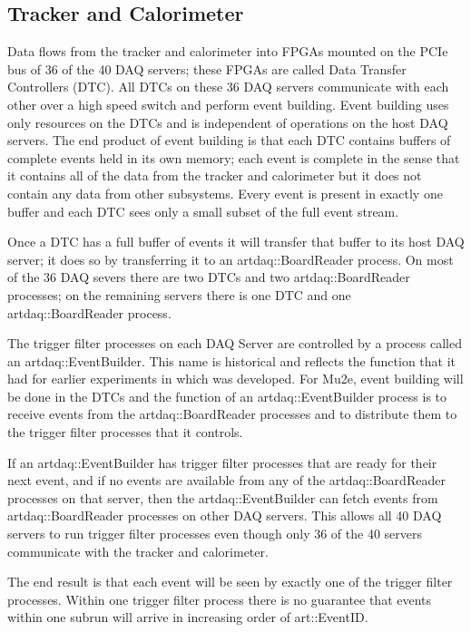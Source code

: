 \subsection{Tracker and Calorimeter}
\label{ssec:TrkAndCal}

Data flows from the tracker and calorimeter into FPGAs mounted on the PCIe bus of 36 of the 40 DAQ servers;
these FPGAs are called Data Transfer Controllers (DTC).
All DTCs on these 36 DAQ servers communicate with each other over a high speed switch
and perform event building.
Event building uses only resources on the DTCs and is independent of operations on the host DAQ servers.
The end product of event building is that each DTC contains buffers of complete events held in its own memory;
each event is complete in the sense that it contains all of the data from the tracker and calorimeter
but it does not contain any data from other subsystems.
Every event is present in exactly one buffer and each DTC sees only a small subset of the full event stream.

Once a DTC has a full buffer of events it will transfer that buffer to its host DAQ server;
it does so by transferring it to an {\code artdaq::BoardReader} process.  On most of the
36 DAQ severs there are two DTCs and two {\code artdaq::BoardReader} processes;
on the remaining servers there is one DTC and one {\code artdaq::BoardReader} process.

The trigger filter processes on each DAQ Server are controlled by a process
called an {\code artdaq::EventBuilder}.
This name is historical and reflects the function that it had for earlier experiments in which \artdaq was developed.
For Mu2e, event building will be done in the DTCs and the function of an
{\code artdaq::EventBuilder} process is to receive events from
the {\code artdaq::BoardReader} processes and to distribute them to the trigger filter \art processes
that it controls.

If an {\code artdaq::EventBuilder} has trigger filter processes that are ready for their next event,
and if no events are available from any of the {\code artdaq::BoardReader} processes on that server,
then the {\code artdaq::EventBuilder} can fetch events from {\code artdaq::BoardReader} processes
on other DAQ servers.
This allows all 40 DAQ servers to run trigger filter processes even though only 36 of the 40 servers
communicate with the tracker and calorimeter.

The end result is that each event will be seen by exactly one of the trigger filter processes.
Within one trigger filter process there is no guarantee that events within one subrun will arrive in
increasing order of {\code art::EventID}.

